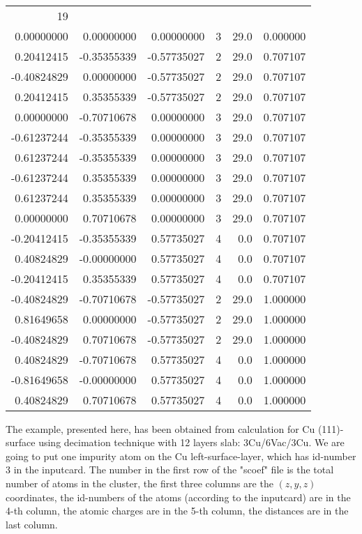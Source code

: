 {\small\tt
  \begin{tabular}{rrrrrr}
    19\phantom{.XXXXXXX} & {}            &       {}     &    {} &  {}  &   {}  
      \\
    0.00000000  &   0.00000000  &   0.00000000 &    3  & 29.0 &   0.000000  \\ 
    0.20412415  &  -0.35355339  &  -0.57735027 &    2  & 29.0 &   0.707107  \\ 
   -0.40824829  &   0.00000000  &  -0.57735027 &    2  & 29.0 &   0.707107  \\
    0.20412415  &   0.35355339  &  -0.57735027 &    2  & 29.0 &   0.707107  \\
    0.00000000  &  -0.70710678  &   0.00000000 &    3  & 29.0 &   0.707107  \\
   -0.61237244  &  -0.35355339  &   0.00000000 &    3  & 29.0 &   0.707107  \\
    0.61237244  &  -0.35355339  &   0.00000000 &    3  & 29.0 &   0.707107  \\
   -0.61237244  &   0.35355339  &   0.00000000 &    3  & 29.0 &   0.707107  \\
    0.61237244  &   0.35355339  &   0.00000000 &    3  & 29.0 &   0.707107  \\
    0.00000000  &   0.70710678  &   0.00000000 &    3  & 29.0 &   0.707107  \\
   -0.20412415  &  -0.35355339  &   0.57735027 &    4  &  0.0 &   0.707107  \\
    0.40824829  &  -0.00000000  &   0.57735027 &    4  &  0.0 &   0.707107  \\
   -0.20412415  &   0.35355339  &   0.57735027 &    4  &  0.0 &   0.707107  \\
   -0.40824829  &  -0.70710678  &  -0.57735027 &    2  & 29.0 &   1.000000  \\
    0.81649658  &   0.00000000  &  -0.57735027 &    2  & 29.0 &   1.000000  \\
   -0.40824829  &   0.70710678  &  -0.57735027 &    2  & 29.0 &   1.000000  \\
    0.40824829  &  -0.70710678  &   0.57735027 &    4  &  0.0 &   1.000000  \\
   -0.81649658  &  -0.00000000  &   0.57735027 &    4  &  0.0 &   1.000000  \\
    0.40824829  &   0.70710678  &   0.57735027 &    4  &  0.0 &   1.000000  \\
 \end{tabular}
}
\bigskip

The example, presented here, has been obtained
from calculation for Cu (111)-surface  using decimation technique with 12 
layers slab: 3Cu/6Vac/3Cu. We are going to put one impurity atom on the Cu 
left-surface-layer, which has id-number 3 in the inputcard.  The number in the 
first row of the "scoef" file is the total number of atoms in the cluster, the 
first three columns are the $(z,y,z)$ coordinates, the id-numbers of the atoms 
(according to the inputcard)
are in the 4-th column, the atomic charges are in the 5-th column, 
the distances are in the last column. 

